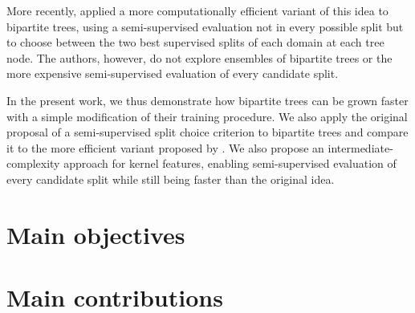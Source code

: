 More recently, \cite{alves2023semisupervised} applied a more computationally efficient variant of this idea to bipartite trees, using a semi-supervised evaluation not in every possible split but to choose between the two best supervised splits of each domain at each tree node. The authors, however, do not explore ensembles of bipartite trees or the more expensive semi-supervised evaluation of every candidate split.

In the present work, we thus demonstrate how bipartite trees can be grown faster with a simple modification of their training procedure. We also apply the original proposal of a semi-supervised split choice criterion to bipartite trees and compare it to the more efficient variant proposed by \cite{alves2023semisupervised}. We also propose an intermediate-complexity approach for kernel features, enabling semi-supervised evaluation of every candidate split while still being faster than the original idea. 


\section{Main objectives}

\section{Main contributions}
